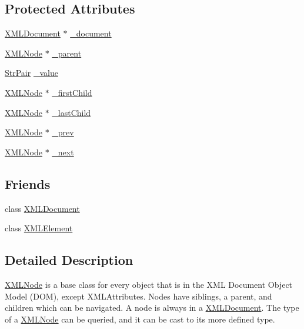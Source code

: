 \subsection*{Protected Attributes}
\begin{DoxyCompactItemize}
\item 
\hyperlink{classtinyxml2_1_1_x_m_l_document}{X\+M\+L\+Document} $\ast$ \hyperlink{classtinyxml2_1_1_x_m_l_node_a8d2d2be0bb6797625551eb0e91f0ff62}{\+\_\+document}
\item 
\hyperlink{classtinyxml2_1_1_x_m_l_node}{X\+M\+L\+Node} $\ast$ \hyperlink{classtinyxml2_1_1_x_m_l_node_a176dd1c4965c21c366de192164aa2c13}{\+\_\+parent}
\item 
\hyperlink{classtinyxml2_1_1_str_pair}{Str\+Pair} \hyperlink{classtinyxml2_1_1_x_m_l_node_a3ea9884098b8379de2bb5ab3fc85c0fc}{\+\_\+value}
\item 
\hyperlink{classtinyxml2_1_1_x_m_l_node}{X\+M\+L\+Node} $\ast$ \hyperlink{classtinyxml2_1_1_x_m_l_node_aa20c91e4213dc930c5bdf420322ca342}{\+\_\+first\+Child}
\item 
\hyperlink{classtinyxml2_1_1_x_m_l_node}{X\+M\+L\+Node} $\ast$ \hyperlink{classtinyxml2_1_1_x_m_l_node_a099b6560ae44ab9edb8453aaf1a3747b}{\+\_\+last\+Child}
\item 
\hyperlink{classtinyxml2_1_1_x_m_l_node}{X\+M\+L\+Node} $\ast$ \hyperlink{classtinyxml2_1_1_x_m_l_node_a9739eb0fb9a1188266052055e7a6bf6b}{\+\_\+prev}
\item 
\hyperlink{classtinyxml2_1_1_x_m_l_node}{X\+M\+L\+Node} $\ast$ \hyperlink{classtinyxml2_1_1_x_m_l_node_a27e985496b37dd00eb5b9cf59b9e3fb1}{\+\_\+next}
\end{DoxyCompactItemize}
\subsection*{Friends}
\begin{DoxyCompactItemize}
\item 
class \hyperlink{classtinyxml2_1_1_x_m_l_node_a4eee3bda60c60a30e4e8cd4ea91c4c6e}{X\+M\+L\+Document}
\item 
class \hyperlink{classtinyxml2_1_1_x_m_l_node_ac2fba9b6e452829dd892f7392c24e0eb}{X\+M\+L\+Element}
\end{DoxyCompactItemize}


\subsection{Detailed Description}
\hyperlink{classtinyxml2_1_1_x_m_l_node}{X\+M\+L\+Node} is a base class for every object that is in the X\+M\+L Document Object Model (D\+O\+M), except X\+M\+L\+Attributes. Nodes have siblings, a parent, and children which can be navigated. A node is always in a \hyperlink{classtinyxml2_1_1_x_m_l_document}{X\+M\+L\+Document}. The type of a \hyperlink{classtinyxml2_1_1_x_m_l_node}{X\+M\+L\+Node} can be queried, and it can be cast to its more defined type.

